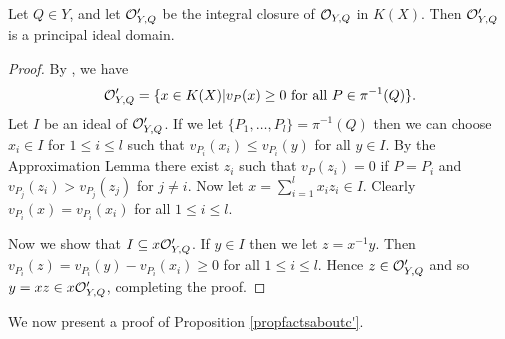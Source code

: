     \begin{lem}\label{lemmapidlemma}
    Let $Q\in Y$, and let ${\cal O}_{Y,Q}'$ be the integral closure of ${\cal O}_{Y,Q}$ in $K(X)$.
    Then ${\cal O}_{Y,Q}'$ is a principal ideal domain.
    \end{lem}
    \begin{proof}
    By \cite[Cor. 3.3.5]{stichtenoth}, we have 
        \[
        \cO_{Y,Q}' = \{x\in K(X)|v_P(x) \geq 0 \ \text{for all} \ P\in \pi^{-1}(Q)\}.
        \]  
    Let $I$ be an ideal of ${\cal O}_{Y,Q}'$.
    If we let $\{P_1,\ldots, P_l\} = \pi^{-1}(Q)$ then we can choose $x_i \in I$ for $1\leq i \leq l$ such that $v_{P_i}(x_i) \leq v_{P_i}(y)$ for all $y\in I$.
    By the Approximation Lemma there exist $z_i$ such that $v_P (z_i) = 0$ if $P=P_i$ and $v_{P_j}(z_i) > v_{P_j}(z_j)$ for $j\neq i$.
    Now let $x = \sum_{i=1}^l x_iz_i \in I$.
    Clearly $v_{P_i}(x) = v_{P_i}(x_i)$ for all $1\leq i\leq l$.
    
    Now we show that $I \subseteq x{\cal O}_{Y,Q}'$.
    If $y\in I$ then we let $z = x^{-1}y$.
    Then $v_{P_i}(z) = v_{P_i}(y) - v_{P_i}(x_i) \geq 0$ for all $1\leq i\leq l$.
    Hence $z\in {\cal O}_{Y,Q}'$ and so $y = xz \in x{\cal O}_{Y,Q}'$, completing the proof.
    \end{proof}

We now present a proof of Proposition \ref{propfactsaboutc'}.

